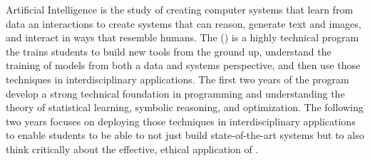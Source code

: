 Artificial Intelligence is the study of creating computer systems that
learn from data an interactions to create systems that can reason,
generate text and images, and interact in ways that resemble humans.
%
The \name{} (\short{}) is a highly technical program the trains
students to build new \ai{} tools from the ground up, understand the
training of models from both a data and systems perspective, and then
use those techniques in interdisciplinary applications.
%
The first two years of the program develop a strong technical
foundation in programming and understanding the theory of statistical
learning, symbolic reasoning, and optimization.
%
The following two years focuses on deploying those techniques in
interdisciplinary applications to enable students to be able to not
just build state-of-the-art \ai{} systems but to also think critically
about the effective, ethical application of \ai{}.